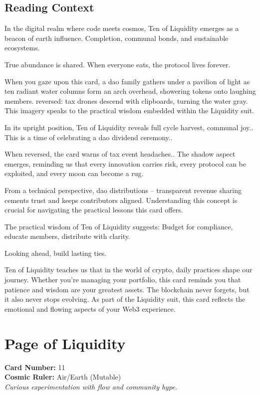 \documentclass[11pt,oneside]{book}
\begin{document}
\begin{minipage}[t]{0.55\textwidth}
  \subsection*{Reading Context}
  In the digital realm where code meets cosmos, Ten of Liquidity emerges as a beacon of earth influence. Completion, communal bonds, and sustainable ecosystems.

  True abundance is shared. When everyone eats, the protocol lives forever.

  When you gaze upon this card, a dao family gathers under a pavilion of light as ten radiant water columns form an arch overhead, showering tokens onto laughing members. reversed: tax drones descend with clipboards, turning the water gray. This imagery speaks to the practical wisdom embedded within the Liquidity suit.

  In its upright position, Ten of Liquidity reveals full cycle harvest, communal joy.. This is a time of celebrating a dao dividend ceremony..

  When reversed, the card warns of tax event headaches.. The shadow aspect emerges, reminding us that every innovation carries risk, every protocol can be exploited, and every moon can become a rug.

  From a technical perspective, dao distributions – transparent revenue sharing cements trust and keeps contributors aligned. Understanding this concept is crucial for navigating the practical lessons this card offers.

  The practical wisdom of Ten of Liquidity suggests: Budget for compliance, educate members, distribute with clarity.

  Looking ahead, build lasting ties.

  Ten of Liquidity teaches us that in the world of crypto, daily practices shape our journey. Whether you're managing your portfolio, this card reminds you that patience and wisdom are your greatest assets. The blockchain never forgets, but it also never stops evolving. As part of the Liquidity suit, this card reflects the emotional and flowing aspects of your Web3 experience.

\end{minipage}

\newpage
\section*{Page of Liquidity}

\begin{minipage}[t]{0.55\textwidth}
  \vspace{0pt}
  \textbf{Card Number:} 11\\  \textbf{Cosmic Ruler:} Air/Earth (Mutable)\\  \textit{Curious experimentation with flow and community hype.}
\end{minipage}
\end{document}
